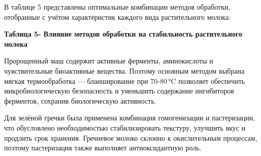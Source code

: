 В таблице 5 представлены оптимальные комбинации методов обработки,
отобранные с учётом характеристик каждого вида растительного молока:

{\bfseries Таблица 5- Влияние методов обработки на стабильность
растительного молока}


Пророщенный маш содержит активные ферменты, аминокислоты и
чувствительные биоактивные вещества. Поэтому основным методом выбрана
мягкая термообработка --- бланширование при 70-80\,°C позволяет
обеспечить микробиологическую безопасность и уменьшить содержание
ингибиторов ферментов, сохранив биологическую активность.

Для зелёной гречки была применена комбинация гомогенизации и
пастеризации, что обусловлено необходимостью стабилизировать текстуру,
улучшить вкус и продлить срок хранения. Гречневое молоко склонно к
окислительным процессам, поэтому пастеризация также выполняет
антиоксидантную роль.


